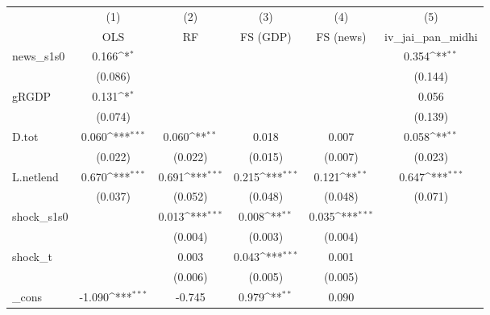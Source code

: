 {
\def\sym#1{\ifmmode^{#1}\else\(^{#1}\)\fi}
\begin{tabular}{l*{5}{c}}
\toprule
            &\multicolumn{1}{c}{(1)}&\multicolumn{1}{c}{(2)}&\multicolumn{1}{c}{(3)}&\multicolumn{1}{c}{(4)}&\multicolumn{1}{c}{(5)}\\
            &\multicolumn{1}{c}{OLS}&\multicolumn{1}{c}{RF}&\multicolumn{1}{c}{FS (GDP)}&\multicolumn{1}{c}{FS (news)}&\multicolumn{1}{c}{iv\_jai\_pan\_midhi}\\
\midrule
news\_s1s0   &       0.166\sym{*}  &                     &                     &                     &       0.354\sym{**} \\
            &     (0.086)         &                     &                     &                     &     (0.144)         \\
\addlinespace
gRGDP       &       0.131\sym{*}  &                     &                     &                     &       0.056         \\
            &     (0.074)         &                     &                     &                     &     (0.139)         \\
\addlinespace
D.tot       &       0.060\sym{***}&       0.060\sym{**} &       0.018         &       0.007         &       0.058\sym{**} \\
            &     (0.022)         &     (0.022)         &     (0.015)         &     (0.007)         &     (0.023)         \\
\addlinespace
L.netlend   &       0.670\sym{***}&       0.691\sym{***}&       0.215\sym{***}&       0.121\sym{**} &       0.647\sym{***}\\
            &     (0.037)         &     (0.052)         &     (0.048)         &     (0.048)         &     (0.071)         \\
\addlinespace
shock\_s1s0  &                     &       0.013\sym{***}&       0.008\sym{**} &       0.035\sym{***}&                     \\
            &                     &     (0.004)         &     (0.003)         &     (0.004)         &                     \\
\addlinespace
shock\_t     &                     &       0.003         &       0.043\sym{***}&       0.001         &                     \\
            &                     &     (0.006)         &     (0.005)         &     (0.005)         &                     \\
\addlinespace
\_cons      &      -1.090\sym{***}&      -0.745         &       0.979\sym{**} &       0.090         &                     \\

\end{tabular}}

